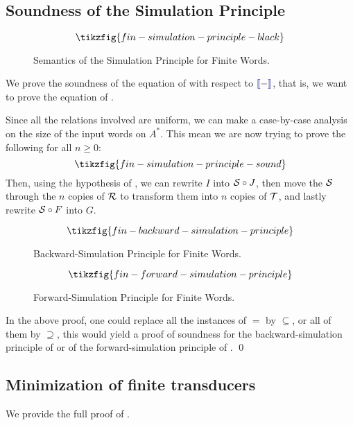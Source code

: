 \subsection{Soundness of the Simulation Principle}\label{app:fin-simulation-principle}


\begin{figure*}
	\[\tikzfig{fin-simulation-principle-black}\]
	\caption{Semantics of the Simulation Principle for Finite Words.}
	\label{appfig:fin-simulation-principle-black}
\end{figure*}

We prove the soundness of the equation of  with respect to $\binterp{-}$, that is, we want to prove the equation of . 

Since all the relations involved are uniform, we can make a case-by-case analysis on the size of the input words on $A^*$. This mean we are now trying to prove the following for all $n \geq 0$:
\[\tikzfig{fin-simulation-principle-sound}\]
Then, using the hypothesis of , we can rewrite $I$ into $\S \circ J$, then move the $\S$ through the $n$ copies of $\R$ to transform them into $n$ copies of $\T$, and lastly rewrite $\S \circ F$ into $G$.

\begin{figure*}[h]
	\[\tikzfig{fin-backward-simulation-principle}\]
	\caption{Backward-Simulation Principle for Finite Words.}
	\label{appfig:fin-backward-simulation-principle}
\end{figure*}

\begin{figure*}[h]
	\[\tikzfig{fin-forward-simulation-principle}\]
	\caption{Forward-Simulation Principle for Finite Words.}
	\label{appfig:fin-forward-simulation-principle}
\end{figure*}

In the above proof, one could replace all the instances of $=$ by $\subseteq$, or all of them by $\supseteq$, this would yield a proof of soundness for the backward-simulation principle of  or of the forward-simulation principle of . \qed



\subsection{Minimization of finite transducers}\label{app:prop:minimization}
	We provide the full proof of .

